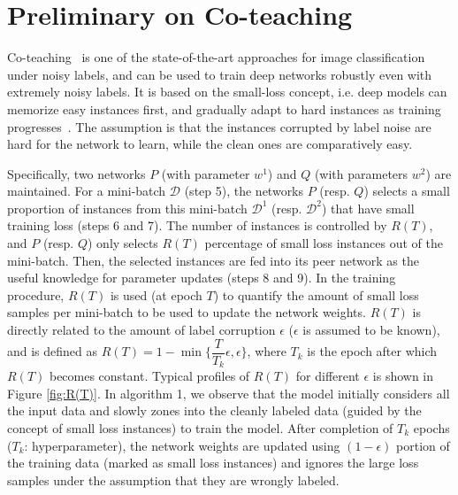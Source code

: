 \section{Preliminary on Co-teaching}
Co-teaching~\cite{coteaching} is one of the state-of-the-art approaches for image classification under noisy labels, and can be used to train deep networks robustly even with extremely noisy labels.
It is based on the small-loss concept, i.e. deep models can memorize easy instances first, and gradually adapt to hard instances as training progresses~\cite{memorization}. 
The assumption is that the instances corrupted by label noise are hard for the network to learn, while the clean ones are comparatively easy. 

Specifically, two networks $P$ (with parameter $w^1$) and $Q$ (with parameters $w^2$) are maintained. 
For a mini-batch $\mathcal{D}$ (step 5), the networks $P$ (resp. $Q$) selects a small proportion of instances from this mini-batch $\mathcal{D}^1$ (resp. $\mathcal{D}^2$) that have small training loss (steps 6 and 7). 
The number of instances is controlled by $R(T)$, and $P$ (resp. $Q$) only selects $R(T)$ percentage of small loss instances out of the mini-batch. Then, the selected instances are fed into its peer network as the useful knowledge for parameter updates (steps 8 and 9).
In the training procedure, $R(T)$ is used (at epoch $T$) to quantify the amount of small loss
samples per mini-batch to be used to update the network weights. $R(T)$ is directly related
to the amount of label corruption $\epsilon$ ($\epsilon$ is assumed to be known), and is defined as $R(T)= 1- \min\bigg\{\dfrac{T}{T_k}\epsilon, \epsilon\bigg\}$, where $T_k$ is the epoch after which $R(T)$ becomes constant. Typical profiles of $R(T)$ for different $\epsilon$ is shown in Figure \ref{fig:R(T)}. In algorithm 1, we observe that the model initially considers all the input data and slowly zones into the cleanly labeled data (guided by the concept of small loss instances) to train the model. After completion of $T_k$ epochs ($T_k$: hyperparameter), the network weights are updated using $(1 - \epsilon)$ portion of the training data (marked as small loss instances) and ignores the large loss samples under the assumption that they are wrongly labeled.
